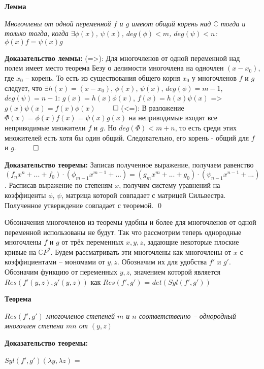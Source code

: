 \documentclass[a4paper, 12pt]{article}
\begin{document}
\textbf{Лемма}

\textit{ Многочлены от одной переменной $f$ и $g$ имеют общий корень над $\mathbb{C}$ тогда и только тогда, когда $\exists \phi(x)$, $\psi(x)$, $deg(\phi) < m$, $deg(\psi) < n$: $\phi(x)f = \psi(x)g$}

\smallskip
\textbf{Доказательство леммы:}
\smallskip
(=>): Для многочленов от одной переменной над полем имеет место теорема Безу о делимости многочлена на одночлен $(x - x_0)$, где $x_0$ -- корень. То есть из существования общего корня $x_0$ у многочленов $f$ и $g$ следует, что $\exists h(x)=(x-x_0)$, $\phi(x)$, $\psi(x)$, $deg(\phi) = m-1$, $deg(\psi) = n-1$: $g(x)=h(x)\phi(x)$, $f(x)=h(x)\psi(x)$ => $g(x)\psi(x) = f(x)\phi(x)$ $\qed$
\smallskip
(<=): В разложение $\Phi(x) = \phi(x)f(x) = \psi(x)g(x)$ на неприводимые входят все неприводимые множители $f$ и $g$. Но $deg(\Phi) < m + n$, то есть среди этих множителей есть хотя бы один общий. Следовательно, его корень - общий для $f$ и $g$. $\qed$

\textbf{Доказательство теоремы:}
\smallskip
Записав полученное выражение, получаем равенство $(f_nx^n + ... + f_0)\cdot(\phi_{m-1}x^{m-1} + ...) = (g_mx^m + ... + g_0)\cdot(\psi_{n-1}x^{n-1} + ...)$.\newline
Расписав выражение по степеням $x$, получим систему уравнений на коэффиценты $\phi$, $\psi$, матрица которой совпадает с матрицей Сильвестра.\newline
Полученное утверждение совпадает с теоремой. \qed
\bigskip

Обозначения многочленов из теоремы удобны и более для многочленов от одной переменной использованы не будут. Так что рассмотрим теперь однородные многочлены $f$ и $g$ от трёх переменных $x,y,z$, задающие некоторые плоские кривые на $\mathbb{C}P^2$.\newline
Будем рассматривать эти многочлены как многочлены от $x$ с коэффициентами -- мономами от $y,z$. Обозначим их для удобства $f'$ и $g'$.\newline
Обозначим функцию от переменных $y,z$, значением которой является\newline $Res(f'(y,z),g'(y,z))$ как $Res(f',g')$ = $det(Syl(f',g'))$

\smallskip
\textbf{Теорема}

\textit{$Res(f',g')$ многочленов степеней $m$ и $n$ соответственно -- однородный многочлен степени $mn$ от $(y,z)$}

\textbf{Доказательство теоремы:}

$Syl(f',g')(\lambda y,\lambda z)$ =
\end{document}
